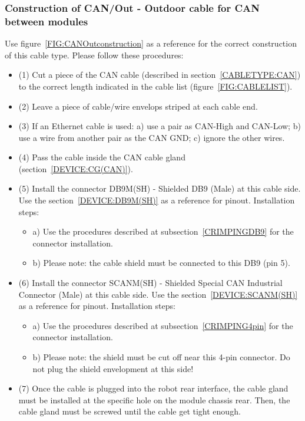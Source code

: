 \subsubsection{Construction of CAN/Out - Outdoor cable for CAN between modules} \label{CONSTRUCTION:CANOut}
Use figure~\ref{FIG:CANOutconstruction} as a reference for the correct construction of this cable type. Please follow these procedures:
\begin{itemize}
  \item (1) Cut a piece of the CAN cable (described in section~\ref{CABLETYPE:CAN}) to the correct length indicated in the cable list (figure~\ref{FIG:CABLELIST}).
  \item (2) Leave a piece of cable/wire envelops striped at each cable end.
  \item (3) If an Ethernet cable is used: a) use a pair as CAN-High and CAN-Low; b) use a wire from another pair as the CAN GND; c) ignore the other wires.
  \item (4) Pass the cable inside the CAN cable gland (section~\ref{DEVICE:CG(CAN)}).
  \item (5) Install the connector DB9M(SH) - Shielded DB9 (Male) at this cable side. Use the section~\ref{DEVICE:DB9M(SH)} as a reference for pinout. Installation steps:
  \begin{itemize}
    \item a) Use the procedures described at subsection~\ref{CRIMPINGDB9} for the connector installation.
    \item b) Please note: the cable shield must be connected to this DB9 (pin 5).
  \end{itemize}
  \item (6) Install the connector SCANM(SH) - Shielded Special CAN Industrial Connector (Male) at this cable side. Use the section~\ref{DEVICE:SCANM(SH)} as a reference for pinout. Installation steps:
  \begin{itemize}
    \item a) Use the procedures described at subsection~\ref{CRIMPING4pin} for the connector installation.
    \item b) Please note: the shield must be cut off near this 4-pin connector. Do not plug the shield envelopment at this side!
  \end{itemize}
  \item (7) Once the cable is plugged into the robot rear interface, the cable gland must be installed at the specific hole on the module chassis rear. Then, the cable gland must be screwed until the cable get tight enough.
\end{itemize}
